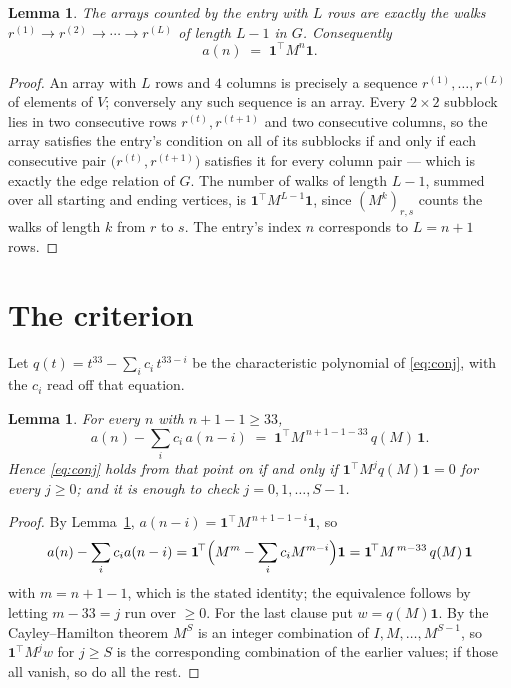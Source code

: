 \documentclass[11pt,a4paper]{article}
\theoremstyle{plain}
\newtheorem{lemma}[theorem]{Lemma}
\theoremstyle{definition}
\begin{document}
\begin{lemma}\label{lem:walk}
The arrays counted by the entry with $L$ rows are exactly the walks
$r^{(1)}\to r^{(2)}\to\cdots\to r^{(L)}$ of length $L-1$ in $G$. Consequently
\[
a(n)\;=\;\mathbf{1}^{\!\top}M^{n}\mathbf{1} .
\]
\end{lemma}

\begin{proof}
An array with $L$ rows and $4$ columns is precisely a sequence
$r^{(1)},\dots,r^{(L)}$ of elements of $V$; conversely any such sequence is an array.
Every $2\times2$ subblock lies in two consecutive rows $r^{(t)},r^{(t+1)}$ and two
consecutive columns, so the array satisfies the entry's condition on all of its subblocks
if and only if each consecutive pair $\bigl(r^{(t)},r^{(t+1)}\bigr)$ satisfies it for
every column pair --- which is exactly the edge relation of $G$. The number of walks of
length $L-1$, summed over all starting and ending vertices, is
$\mathbf{1}^{\!\top}M^{L-1}\mathbf{1}$, since $(M^{k})_{r,s}$ counts the walks of
length $k$ from $r$ to $s$. The entry's index $n$ corresponds to $L=n+1$ rows.
\end{proof}

\section{The criterion}

Let $q(t)=t^{33}-\sum_i c_i\,t^{33-i}$ be the characteristic polynomial of
\eqref{eq:conj}, with the $c_i$ read off that equation.

\begin{lemma}\label{lem:crit}
For every $n$ with $n+1-1\ge33$,
\[
a(n)-\sum_i c_i\,a(n-i)\;=\;\mathbf{1}^{\!\top}M^{\,n+1-1-33}\,q(M)\,\mathbf{1} .
\]
Hence \eqref{eq:conj} holds from that point on if and only if
$\mathbf{1}^{\!\top}M^{j}q(M)\mathbf{1}=0$ for every $j\ge0$; and it is enough to check
$j=0,1,\dots,S-1$.
\end{lemma}

\begin{proof}
By Lemma~\ref{lem:walk}, $a(n-i)=\mathbf{1}^{\!\top}M^{\,n+1-1-i}\mathbf{1}$, so
\[
a(n)-\sum_i c_i a(n-i)
=\mathbf{1}^{\!\top}\Bigl(M^{m}-\sum_i c_i M^{m-i}\Bigr)\mathbf{1}
=\mathbf{1}^{\!\top}M^{\,m-33}\,q(M)\,\mathbf{1}
\]
with $m=n+1-1$, which is the stated identity; the equivalence follows by letting
$m-33=j$ run over $\ge0$. For the last clause put $w=q(M)\mathbf{1}$. By the
Cayley--Hamilton theorem $M^{S}$ is an integer combination of $I,M,\dots,M^{S-1}$, so
$\mathbf{1}^{\!\top}M^{j}w$ for $j\ge S$ is the corresponding combination of the earlier
values; if those all vanish, so do all the rest.
\end{proof}
\end{document}

